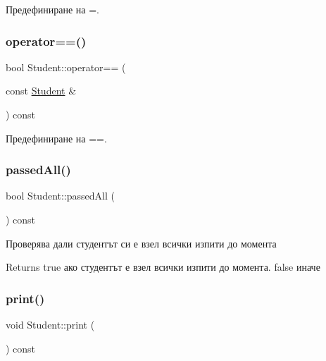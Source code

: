 Предефиниране на =. 

\mbox{\label{class_student_abb6d4d284794dfd4af8277c5dacc3911}} 
\subsubsection{\texorpdfstring{operator==()}{operator==()}}
{\footnotesize\ttfamily bool Student\+::operator== (\begin{DoxyParamCaption}\item[{const \hyperlink{class_student}{Student} \&}]{ }\end{DoxyParamCaption}) const}



Предефиниране на ==. 

\mbox{\label{class_student_a29d78e43e7fa033e1497fa26c02edf0f}} 
\subsubsection{\texorpdfstring{passed\+All()}{passedAll()}}
{\footnotesize\ttfamily bool Student\+::passed\+All (\begin{DoxyParamCaption}{ }\end{DoxyParamCaption}) const}



Проверява дали студентът си е взел всички изпити до момента 

\begin{DoxyReturn}{Returns}
true ако студентът е взел всички изпити до момента. false иначе 
\end{DoxyReturn}
\mbox{\label{class_student_abdbb14cd83ef23c09f811bd1e30ddd4f}} 
\subsubsection{\texorpdfstring{print()}{print()}}
{\footnotesize\ttfamily void Student\+::print (\begin{DoxyParamCaption}{ }\end{DoxyParamCaption}) const}

\mbox{\label{class_student_a144829ea7cbfa16de9bc079365388f13}} 
